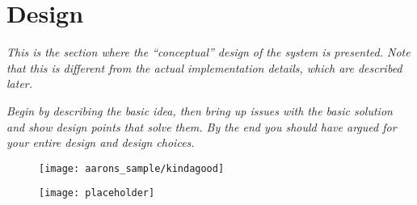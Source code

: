 \section{Design}

{\em This is the section where the ``conceptual'' design of the system
  is presented.  Note that this is different from the actual
  implementation details, which are described later.}

{\em Begin by describing the basic idea, then bring up issues with the basic
solution and show design points that solve them. By the end you should have
argued for your entire design and design choices.}



\begin{figure}[]
 \centering
 \texttt{[image: aarons\_sample/kindagood]}
\end{figure}


\begin{figure}[t]
 \centering
 \texttt{[image: placeholder]}
\end{figure}



